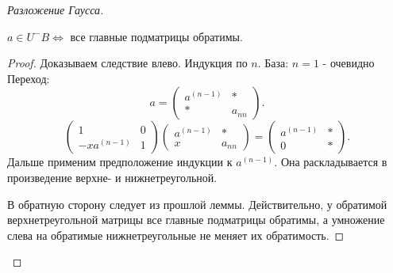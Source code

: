 \documentclass[12pt]{report}
\begin{document}
\begin{proof}[Разложение Гаусса]
    \begin{lm}
        $a \in  U^- B \Leftrightarrow $ все главные подматрицы обратимы.
    \end{lm}
    \begin{proof}
	Доказываем следствие влево.
        Индукция по $n$.
	База: $n=1$ - очевидно\\
	Переход: \\
	\[
	a = 
	\left ( 
	\begin{array}{cc}
	    a^{(n-1)} & * \\
	    * & a_{nn}
	\end{array}
	\right )
	.\] 
	\[
	     \left ( 
	    \begin{array}{cc}
		1&0\\-xa^{(n-1)}&1
	    \end{array}
	    \right )
	    \left ( 
	    \begin{array}{cc}
		a^{(n-1)} & *\\
		x&a_{nn}
	    \end{array}
	    \right )=
	    \left ( 
	    \begin{array}{cc}
		a^{(n-1)}&*\\0&*
	    \end{array}
	    \right )
	.\] 
	Дальше применим предположение индукции к $a^{(n-1)}$. Она раскладывается в произведение верхне- и нижнетреугольной.

	В обратную сторону следует из прошлой леммы.
	Действительно, у обратимой верхнетреугольной матрицы все главные подматрицы обратимы, а умножение слева на обратимые 	нижнетреугольные не меняет их обратимость.
    \end{proof}


\end{proof}
\end{document}
